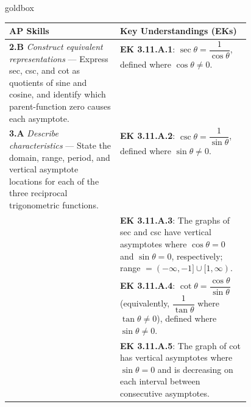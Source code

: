 \documentclass[10pt]{article}
\begin{document}
\begin{skillbox}{goldbox}
\begin{tabularx}{\linewidth}{@{} p{0.46\linewidth} X @{}}
\textbf{AP Skills} & \textbf{Key Understandings (EKs)} \\
\midrule
\textbf{2.B} \textit{Construct equivalent representations} ---
  Express sec, csc, and cot as quotients of sine and cosine, and identify
  which parent-function zero causes each asymptote.
&
\textbf{EK 3.11.A.1}: $\sec\theta = \dfrac{1}{\cos\theta}$, defined where
$\cos\theta \neq 0$. \\[6pt]

\textbf{3.A} \textit{Describe characteristics} ---
  State the domain, range, period, and vertical asymptote locations for
  each of the three reciprocal trigonometric functions.
&
\textbf{EK 3.11.A.2}: $\csc\theta = \dfrac{1}{\sin\theta}$, defined where
$\sin\theta \neq 0$. \\[6pt]

&
\textbf{EK 3.11.A.3}: The graphs of sec and csc have vertical asymptotes
where $\cos\theta = 0$ and $\sin\theta = 0$, respectively; range
$= (-\infty,-1]\cup[1,\infty)$. \\[6pt]

&
\textbf{EK 3.11.A.4}: $\cot\theta = \dfrac{\cos\theta}{\sin\theta}$
(equivalently, $\dfrac{1}{\tan\theta}$ where $\tan\theta \neq 0$),
defined where $\sin\theta \neq 0$. \\[6pt]

&
\textbf{EK 3.11.A.5}: The graph of cot has vertical asymptotes where
$\sin\theta = 0$ and is decreasing on each interval between consecutive
asymptotes. \\
\end{tabularx}
\end{skillbox}

\vspace{0.08in}
\end{document}
